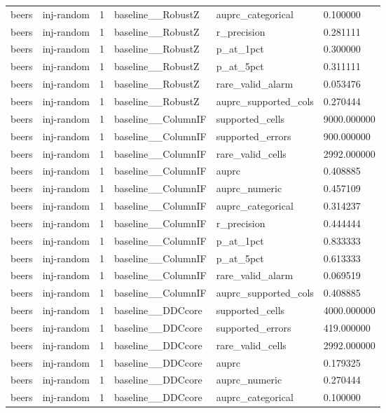 \begin{tabular}{llllll}
beers & inj-random & 1 & baseline\_\_RobustZ & auprc\_categorical & 0.100000 \\
beers & inj-random & 1 & baseline\_\_RobustZ & r\_precision & 0.281111 \\
beers & inj-random & 1 & baseline\_\_RobustZ & p\_at\_1pct & 0.300000 \\
beers & inj-random & 1 & baseline\_\_RobustZ & p\_at\_5pct & 0.311111 \\
beers & inj-random & 1 & baseline\_\_RobustZ & rare\_valid\_alarm & 0.053476 \\
beers & inj-random & 1 & baseline\_\_RobustZ & auprc\_supported\_cols & 0.270444 \\
beers & inj-random & 1 & baseline\_\_ColumnIF & supported\_cells & 9000.000000 \\
beers & inj-random & 1 & baseline\_\_ColumnIF & supported\_errors & 900.000000 \\
beers & inj-random & 1 & baseline\_\_ColumnIF & rare\_valid\_cells & 2992.000000 \\
beers & inj-random & 1 & baseline\_\_ColumnIF & auprc & 0.408885 \\
beers & inj-random & 1 & baseline\_\_ColumnIF & auprc\_numeric & 0.457109 \\
beers & inj-random & 1 & baseline\_\_ColumnIF & auprc\_categorical & 0.314237 \\
beers & inj-random & 1 & baseline\_\_ColumnIF & r\_precision & 0.444444 \\
beers & inj-random & 1 & baseline\_\_ColumnIF & p\_at\_1pct & 0.833333 \\
beers & inj-random & 1 & baseline\_\_ColumnIF & p\_at\_5pct & 0.613333 \\
beers & inj-random & 1 & baseline\_\_ColumnIF & rare\_valid\_alarm & 0.069519 \\
beers & inj-random & 1 & baseline\_\_ColumnIF & auprc\_supported\_cols & 0.408885 \\
beers & inj-random & 1 & baseline\_\_DDCcore & supported\_cells & 4000.000000 \\
beers & inj-random & 1 & baseline\_\_DDCcore & supported\_errors & 419.000000 \\
beers & inj-random & 1 & baseline\_\_DDCcore & rare\_valid\_cells & 2992.000000 \\
beers & inj-random & 1 & baseline\_\_DDCcore & auprc & 0.179325 \\
beers & inj-random & 1 & baseline\_\_DDCcore & auprc\_numeric & 0.270444 \\
beers & inj-random & 1 & baseline\_\_DDCcore & auprc\_categorical & 0.100000 \\

\end{tabular}
